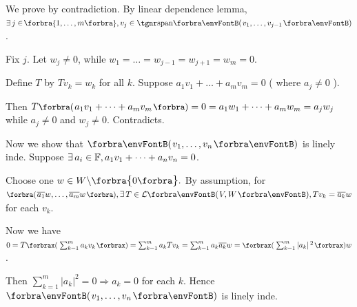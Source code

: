 \documentclass[a4paper, 11pt, UTF8]{article}
\begin{document}
\begin{large}
\par\quad
We prove by contradiction. By linear dependence lemma, $\exists\,j\in\!\Bra{1,\dots,m},v_j\in\Span{v_1,\dots,v_{j-1}}$.\par\quad
Fix $j$. Let $w_j\neq 0$, while $w_1=\dots=w_{j-1}=w_{j+1}=w_m=0.$\par\quad
Define $T$ by $Tv_k=w_k$ for all $k$. Suppose $a_1 v_1+\dots+a_m v_m=0$ ( where $a_j\neq 0$ ).\par\quad
Then $T\BigPar{a_1 v_1+\dots+a_m v_m}=0=a_1 w_1+\dots+a_m w_m=a_j w_j$ while $a_j\neq 0$ and $w_j\neq 0.$ Contradicts.\PfEnd\vspace{6pt}\quad
\Or {}\par\quad
{Now we show that $\Par{v_1,\dots,v_n}$ is linely inde. Suppose {$\exists\,a_i\in{\mathbb{F}},a_1 v_1+\dots+a_n v_n=0$}.}\vspace{2pt}\par\quad
{Choose one $w\in W\backslash\envFontDefault\zeroSubs.$ By assumption, for {$\BigPar{\overline{a_1}w,\dots,\overline{a_m}w},\exists\,T\in\Lm{V,W},Tv_k=\overline{a_k}w$} for each $v_k$.}\vspace{2pt}\par\quad
{Now we have {$ 0=T\XPar{\sum_{k=1}^m a_k v_k}=\sum_{k=1}^m a_k Tv_k=\sum_{k=1}^m a_k\overline{a_k}w=\XPar{\sum_{k=1}^m \left|a_k\right|{^2}}w$}.}\par\quad
{Then {$\sum_{k=1}^m\left|a_k\right|^2=0\Rightarrow a_k=0$} for each $k.$ Hence $\Par{v_1,\dots,v_n}$ is linely inde.}\PfEnd
\SepLine


\end{large}
\end{document}
